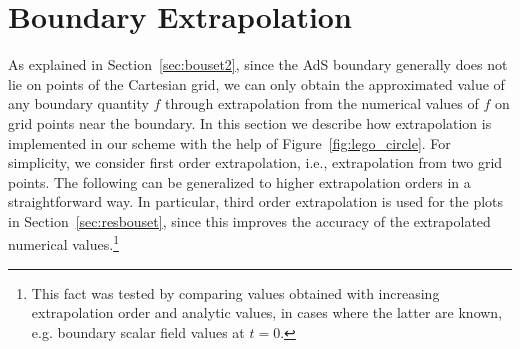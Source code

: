\documentclass[a4paper,11pt]{article}
\numberwithin{equation}{section}
\begin{document}

%


\section{Boundary Extrapolation}\label{sec:extrapconvbdy}

As explained in Section~\ref{sec:bouset2}, since the AdS boundary generally does not lie on points of the Cartesian grid, we can only obtain the approximated value of any boundary quantity $f$ through extrapolation from the numerical values of $f$ on grid points near the boundary. In this section we describe how extrapolation is implemented in our scheme with the help of Figure~\ref{fig:lego_circle}. For simplicity, we consider first order extrapolation, i.e., extrapolation from two grid points. The following can be generalized to higher extrapolation orders in a straightforward way. In particular, third order extrapolation is used for the plots in Section~\ref{sec:resbouset}, since this improves the accuracy of the extrapolated numerical values.\footnote{This fact was tested by comparing values obtained with increasing extrapolation order and analytic values, in cases where the latter are known, e.g. boundary scalar field values at $t=0$.}
\end{document}
